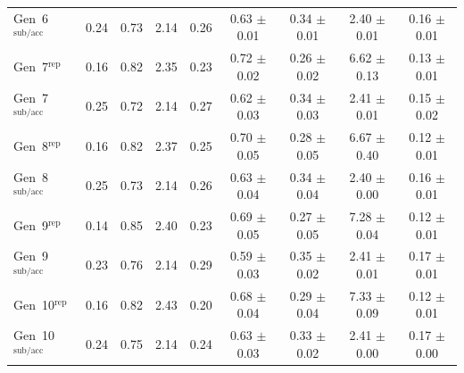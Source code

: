 \begin{tabular}{lcccccccc}
Gen~6$^{\mathrm{sub/acc}}$ & 0.24 & 0.73 & 2.14 & 0.26 & 0.63 $\pm$ 0.01 & 0.34 $\pm$ 0.01 & 2.40 $\pm$ 0.01 & 0.16 $\pm$ 0.01 \\
\addlinespace[1pt]
Gen~7$^{\mathrm{rep}}$ & 0.16 & 0.82 & 2.35 & 0.23 & 0.72 $\pm$ 0.02 & 0.26 $\pm$ 0.02 & 6.62 $\pm$ 0.13 & 0.13 $\pm$ 0.01 \\
Gen~7$^{\mathrm{sub/acc}}$ & 0.25 & 0.72 & 2.14 & 0.27 & 0.62 $\pm$ 0.03 & 0.34 $\pm$ 0.03 & 2.41 $\pm$ 0.01 & 0.15 $\pm$ 0.02 \\
\addlinespace[1pt]
Gen~8$^{\mathrm{rep}}$ & 0.16 & 0.82 & 2.37 & 0.25 & 0.70 $\pm$ 0.05 & 0.28 $\pm$ 0.05 & 6.67 $\pm$ 0.40 & 0.12 $\pm$ 0.01 \\
Gen~8$^{\mathrm{sub/acc}}$ & 0.25 & 0.73 & 2.14 & 0.26 & 0.63 $\pm$ 0.04 & 0.34 $\pm$ 0.04 & 2.40 $\pm$ 0.00 & 0.16 $\pm$ 0.01 \\
\addlinespace[1pt]
Gen~9$^{\mathrm{rep}}$ & 0.14 & 0.85 & 2.40 & 0.23 & 0.69 $\pm$ 0.05 & 0.27 $\pm$ 0.05 & 7.28 $\pm$ 0.04 & 0.12 $\pm$ 0.01 \\
Gen~9$^{\mathrm{sub/acc}}$ & 0.23 & 0.76 & 2.14 & 0.29 & 0.59 $\pm$ 0.03 & 0.35 $\pm$ 0.02 & 2.41 $\pm$ 0.01 & 0.17 $\pm$ 0.01 \\
\addlinespace[1pt]
Gen~10$^{\mathrm{rep}}$ & 0.16 & 0.82 & 2.43 & 0.20 & 0.68 $\pm$ 0.04 & 0.29 $\pm$ 0.04 & 7.33 $\pm$ 0.09 & 0.12 $\pm$ 0.01 \\
Gen~10$^{\mathrm{sub/acc}}$ & 0.24 & 0.75 & 2.14 & 0.24 & 0.63 $\pm$ 0.03 & 0.33 $\pm$ 0.02 & 2.41 $\pm$ 0.00 & 0.17 $\pm$ 0.00 \\
\bottomrule
\end{tabular}
